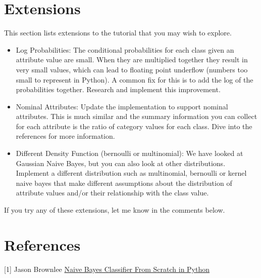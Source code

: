 \documentclass[12pt]{article}
\begin{document}
\section{Extensions}

This section lists extensions to the tutorial that you may wish to explore.\\

\begin{itemize}
    \item Log Probabilities: The conditional probabilities for each class given an attribute value are small. When they are multiplied together they result in very small values, which can lead to floating point underflow (numbers too small to represent in Python). A common fix for this is to add the log of the probabilities together. Research and implement this improvement.
    \item Nominal Attributes: Update the implementation to support nominal attributes. This is much similar and the summary information you can collect for each attribute is the ratio of category values for each class. Dive into the references for more information.
    \item Different Density Function (bernoulli or multinomial): We have looked at Gaussian Naive Bayes, but you can also look at other distributions. Implement a different distribution such as multinomial, bernoulli or kernel naive bayes that make different assumptions about the distribution of attribute values and/or their relationship with the class value.
\end{itemize}

If you try any of these extensions, let me know in the comments below.

\section{References}

[1] Jason Brownlee \href{https://machinelearningmastery.com/naive-bayes-classifier-scratch-python/}{Naive Bayes Classifier From Scratch in Python}
\end{document}
